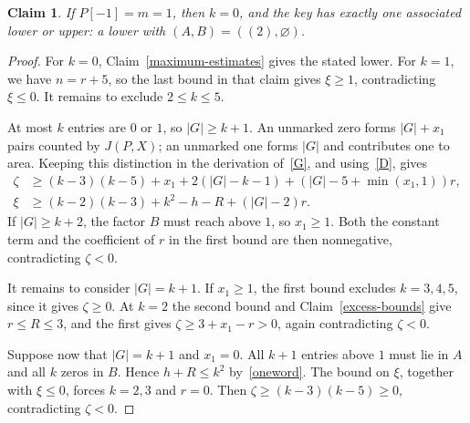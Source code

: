\documentclass[11pt]{article}
\newtheorem{claim}{Claim}
\begin{document}
\begin{claim}\label{binary-maximum}
If $P[-1]=m=1$, then $k=0$, and the key has exactly one associated lower or upper: a lower with $(A,B)=((2),\varnothing)$.
\end{claim}
\begin{proof}
For $k=0$, Claim~\ref{maximum-estimates} gives the stated lower. For $k=1$, we have $n=r+5$, so the last bound in that claim gives $\xi\ge1$, contradicting $\xi\le0$. It remains to exclude $2\le k\le5$.

At most $k$ entries are $0$ or $1$, so $|G|\ge k+1$. An unmarked zero forms $|G|+x_1$ pairs counted by $J(P,X)$; an unmarked one forms $|G|$ and contributes one to area. Keeping this distinction in the derivation of~\eqref{G}, and using~\eqref{D}, gives
\begin{align*}
 \zeta&\ge (k-3)(k-5)+x_1+2(|G|-k-1)+(|G|-5+\min(x_1,1))r,\\
 \xi&\ge (k-2)(k-3)+k^2-h-R+(|G|-2)r.
\end{align*}
If $|G|\ge k+2$, the factor $B$ must reach above $1$, so $x_1\ge1$. Both the constant term and the coefficient of $r$ in the first bound are then nonnegative, contradicting $\zeta<0$.

It remains to consider $|G|=k+1$. If $x_1\ge1$, the first bound excludes $k=3,4,5$, since it gives $\zeta\ge0$. At $k=2$ the second bound and Claim~\ref{excess-bounds} give $r\le R\le3$, and the first gives $\zeta\ge3+x_1-r>0$, again contradicting $\zeta<0$.

Suppose now that $|G|=k+1$ and $x_1=0$. All $k+1$ entries above $1$ must lie in $A$ and all $k$ zeros in $B$. Hence $h+R\le k^2$ by~\eqref{oneword}. The bound on $\xi$, together with $\xi\le0$, forces $k=2,3$ and $r=0$. Then $\zeta\ge(k-3)(k-5)\ge0$, contradicting $\zeta<0$.
\end{proof}
\end{document}
